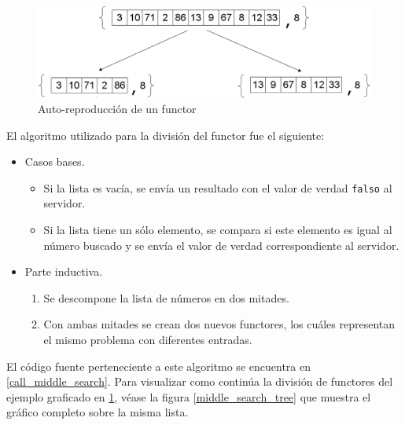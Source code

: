 \begin{figure}[ht]
    \begin{center}
        \includegraphics[scale=.35]{images/functors_division_list.png}
        \caption{Auto-reproducción de un functor}
        \label{functors_division_list}
    \end{center}
\end{figure}

El algoritmo utilizado para la división del functor fue el siguiente:
\begin{itemize}
    \item   Casos bases.
            \begin{itemize}
                \item   Si la lista es vacía, se envía un resultado con el valor de verdad \texttt{falso} al servidor.
                \item   Si la lista tiene un sólo elemento, se compara si este elemento es igual al número buscado y se envía el valor de
                        verdad correspondiente al servidor.
            \end{itemize}
    \item   Parte inductiva.
            \begin{enumerate}
                \item   Se descompone la lista de números en dos mitades.
                \item   Con ambas mitades se crean dos nuevos functores, los cuáles representan el mismo problema con diferentes entradas.
            \end{enumerate}
\end{itemize}

El código fuente perteneciente a este algoritmo se encuentra en \ref{call_middle_search}. Para visualizar como continúa la división
de functores del ejemplo graficado en \ref{functors_division_list}, véase la figura \ref{middle_search_tree} que muestra el gráfico
completo sobre la misma lista.

